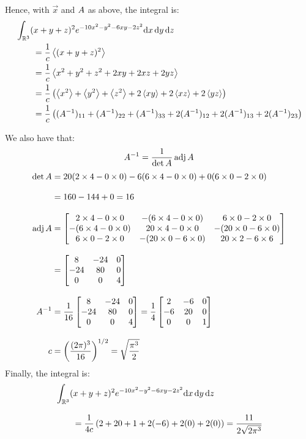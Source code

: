 Hence, with $\vec{x}$ and ${A}$ as above, the integral is:
\begin{align}
   & \int_{\mathbb{R}^3} (x + y + z)^2 e^{-10x^2 - y^2 - 6xy - 2z^2} \text{d}{}{x}\,\text{d}{}{y}\,\text{d}{}{z}
  \nonumber
  \\
   & \qquad =
  \frac{1}{c}\left\langle{(x + y + z)^2}\right\rangle
  \nonumber
  \\
   & \qquad =
  \frac{1}{c}\left\langle{x^2 + y^2 + z^2 + 2xy + 2xz + 2yz}\right\rangle
  \nonumber
  \\
   & \qquad =
  \frac{1}{c}\left(\left\langle{x^2}\right\rangle + \left\langle{y^2}\right\rangle + \left\langle{z^2}\right\rangle + 2\left\langle{xy}\right\rangle + 2\left\langle{xz}\right\rangle + 2\left\langle{yz}\right\rangle\right)
  \nonumber
  \\
   & \qquad =
  \frac{1}{c}\left((A^{-1})_{11} + (A^{-1})_{22} + (A^{-1})_{33} + 2(A^{-1})_{12} + 2(A^{-1})_{13} + 2(A^{-1})_{23}\right)
\end{align}

We also have that:
\begin{equation}
  {A}^{-1} = \frac{1}{\det{A}}\operatorname{\text{adj}}{A}
\end{equation}
\begin{align*}
  \det{A}
    & =
  20 (2 \times 4 - 0 \times 0) - 6 (6 \times 4 - 0 \times 0) + 0 (6 \times 0 - 2 \times 0)
  \\[2ex]
    & = 160 - 144 + 0 = 16
  \\[2ex]
  \operatorname{\text{adj}}{A}
    & =
  \begin{bmatrix}
    2 \times 4 - 0 \times 0    & -(6 \times 4 - 0 \times 0)  & 6 \times 0 - 2 \times 0
    \\
    -(6 \times 4 - 0 \times 0) & 20 \times 4 - 0 \times 0    & -(20 \times 0 - 6 \times 0)
    \\
    6 \times 0 - 2 \times 0    & -(20 \times 0 - 6 \times 0) & 20 \times 2 - 6 \times 6
  \end{bmatrix}
  \\[2ex]
    & =
  \begin{bmatrix}
    8   & -24 & 0
    \\
    -24 & 80  & 0
    \\
    0   & 0   & 4
  \end{bmatrix}
  \\[2ex]
  {A}^{-1}
    & = \frac{1}{16}
  \begin{bmatrix}
    8   & -24 & 0
    \\
    -24 & 80  & 0
    \\
    0   & 0   & 4
  \end{bmatrix}
  = \frac{1}{4}
  \begin{bmatrix}
    2  & -6 & 0
    \\
    -6 & 20 & 0
    \\
    0  & 0  & 1
  \end{bmatrix}
  \\[2ex]
  c & =
  \left(\frac{(2\pi)^3}{16}\right)^{1/2} = \sqrt{\frac{\pi^3}{2}}
\end{align*}
Finally, the integral is:
\begin{align*}
   & \int_{\mathbb{R}^3} (x + y + z)^2 e^{-10x^2 - y^2 - 6xy - 2z^2} \text{d}{}{x}\,\text{d}{}{y}\,\text{d}{}{z}
  \\[2ex]
   & \qquad = \frac{1}{4c}\left(2 + 20 + 1 + 2(-6) + 2(0) + 2(0)\right)
  = \frac{11}{2 \sqrt{2\pi^3}}
\end{align*}
